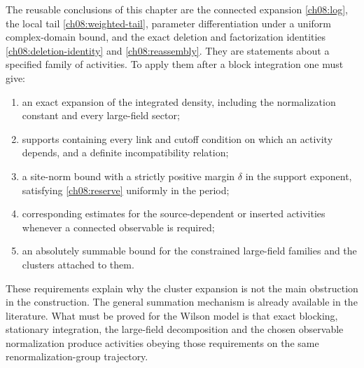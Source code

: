 The reusable conclusions of this chapter are the connected expansion
\eqref{ch08:log}, the local tail \eqref{ch08:weighted-tail}, parameter
differentiation under a uniform complex-domain bound, and the exact deletion
and factorization identities \eqref{ch08:deletion-identity} and \eqref{ch08:reassembly}. They are statements about a specified family
of activities. To apply them after a block integration one must give:
\begin{enumerate}
 \item an exact expansion of the integrated density, including the
 normalization constant and every large-field sector;
 \item supports containing every link and cutoff condition on which an
 activity depends, and a definite incompatibility relation;
 \item a site-norm bound with a strictly positive margin $\delta$ in the support exponent,
 satisfying \eqref{ch08:reserve} uniformly in the period;
 \item corresponding estimates for the source-dependent or inserted
 activities whenever a connected observable is required;
 \item an absolutely summable bound for the constrained large-field
 families and the clusters attached to them.
\end{enumerate}
These requirements explain why the cluster expansion is not the main
obstruction in the construction. The general summation mechanism is
already available in the literature. What must be proved for the Wilson
model is that exact blocking, stationary integration, the large-field
decomposition and the chosen observable normalization produce activities
obeying those requirements on the same renormalization-group trajectory.
